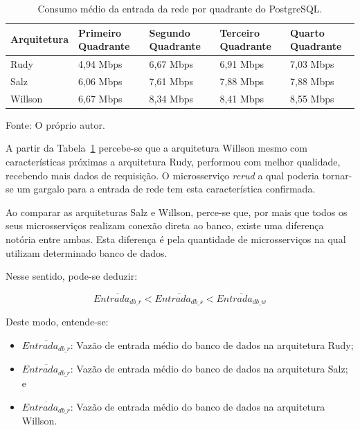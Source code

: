 \begin{table}[htb!]
\centering
\begin{adjustbox}{max width=\textwidth}
\caption{Consumo médio da entrada da rede por quadrante do PostgreSQL.}
\label{tab:net_in_db_media_quadrantes}

\begin{tabular}{|l|l|l|l|l|}
\hline
Arquitetura & Primeiro Quadrante & Segundo Quadrante & Terceiro Quadrante & Quarto Quadrante \\ \hline
Rudy        & 4,94 Mbps            & 6,67 Mbps           & 6,91 Mbps            & 7,03 Mbps          \\ \hline
Salz        & 6,06 Mbps            & 7,61 Mbps           & 7,88 Mbps            & 7,88 Mbps          \\ \hline
Willson     & 6,67 Mbps            & 8,34 Mbps          & 8,41 Mbps            & 8,55 Mbps          \\ \hline
\end{tabular}
\end{adjustbox}

Fonte: O próprio autor.
\end{table}

A partir da Tabela~\ref{tab:net_in_db_media_quadrantes} percebe-se que a arquitetura Willson mesmo com características próximas a arquitetura Rudy, performou com melhor qualidade, recebendo mais dados de requisição.
%
O microsserviço \textit{rcrud} a qual poderia tornar-se um gargalo para a entrada de rede tem esta característica confirmada.

Ao comparar as arquiteturas Salz e Willson, perce-se que, por mais que todos os seus microsserviços realizam conexão direta ao banco, existe uma diferença notória entre ambas.
%
Esta diferença é pela quantidade de microsserviços na qual utilizam determinado banco de dados.

Nesse sentido, pode-se deduzir:

$$
    \overline{Entrada_{db\_r}} < \overline{Entrada_{db\_s}} < \overline{Entrada_{db\_w}}
$$

Deste modo, entende-se:

\begin{itemize}
 \item $\overline{Entrada_{db\_r}}$: Vazão de entrada médio do banco de dados na arquitetura Rudy;
 \item $\overline{Entrada_{db\_r}}$: Vazão de entrada médio do banco de dados na arquitetura Salz; e
 \item $\overline{Entrada_{db\_r}}$: Vazão de entrada médio do banco de dados na arquitetura Willson.
\end{itemize}

